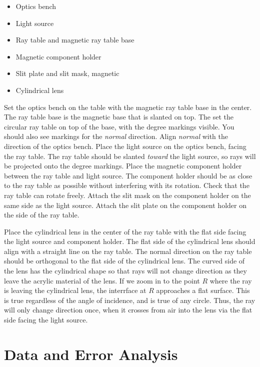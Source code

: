 \documentclass[12pt,twocolumn]{article}
\begin{document}
\begin{itemize}
\item Optics bench
\item Light source
\item Ray table and magnetic ray table base
\item Magnetic component holder
\item Slit plate and slit mask, magnetic
\item Cylindrical lens
\end{itemize}

Set the optics bench on the table with the magnetic ray table base in the center.  The ray table base is the magnetic base that is slanted on top.  The set the circular ray table on top of the base, with the degree markings visible.  You should also see markings for the \textit{normal} direction.  Align \textit{normal} with the direction of the optics bench.  Place the light source on the optics bench, facing the ray table.  The ray table should be slanted \textit{toward} the light source, so rays will be projected onto the degree markings.  Place the magnetic component holder between the ray table and light source.  The component holder should be as close to the ray table as possible without interfering with its rotation.  Check that the ray table can rotate freely.  Attach the slit mask on the component holder on the same side as the light source.  Attach the slit plate on the component holder on the side of the ray table.

Place the cylindrical lens in the center of the ray table with the flat side facing the light source and component holder.  The flat side of the cylindrical lens should align with a straight line on the ray table.  The normal direction on the ray table should be orthogonal to the flat side of the cylindrical lens.  The curved side of the lens has the cylindrical shape so that rays will not change direction as they leave the acrylic material of the lens.  If we zoom in to the point $R$ where the ray is leaving the cylindrical lens, the interrface at $R$ approaches a flat surface.  This is true regardless of the angle of incidence, and is true of any circle.  Thus, the ray will only change direction once, when it crosses from air into the lens via the flat side facing the light source.

\section{Data and Error Analysis}
\end{document}
